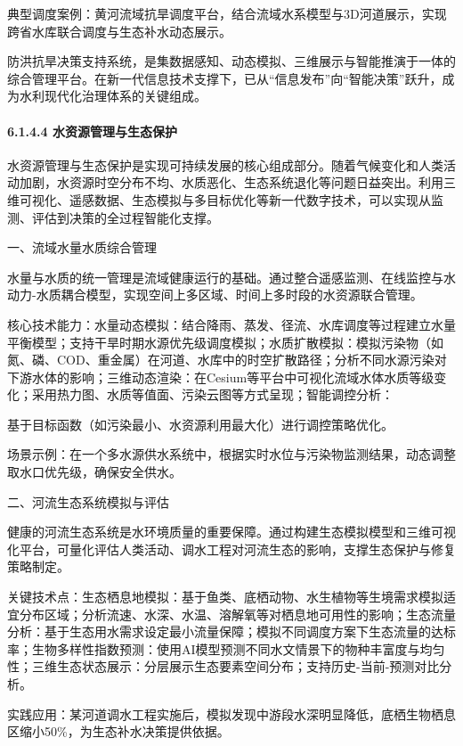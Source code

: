 典型调度案例：黄河流域抗旱调度平台，结合流域水系模型与3D河道展示，实现跨省水库联合调度与生态补水动态展示。

防洪抗旱决策支持系统，是集数据感知、动态模拟、三维展示与智能推演于一体的综合管理平台。在新一代信息技术支撑下，已从``信息发布''向``智能决策''跃升，成为水利现代化治理体系的关键组成。

\paragraph{6.1.4.4 水资源管理与生态保护}\label{ux6c34ux8d44ux6e90ux7ba1ux7406ux4e0eux751fux6001ux4fddux62a4}

水资源管理与生态保护是实现可持续发展的核心组成部分。随着气候变化和人类活动加剧，水资源时空分布不均、水质恶化、生态系统退化等问题日益突出。利用三维可视化、遥感数据、生态模拟与多目标优化等新一代数字技术，可以实现从监测、评估到决策的全过程智能化支撑。

一、流域水量水质综合管理

水量与水质的统一管理是流域健康运行的基础。通过整合遥感监测、在线监控与水动力-水质耦合模型，实现空间上多区域、时间上多时段的水资源联合管理。

核心技术能力：水量动态模拟：结合降雨、蒸发、径流、水库调度等过程建立水量平衡模型；支持干旱时期水源优先级调度模拟；水质扩散模拟：模拟污染物（如氮、磷、COD、重金属）在河道、水库中的时空扩散路径；分析不同水源污染对下游水体的影响；三维动态渲染：在Cesium等平台中可视化流域水体水质等级变化；采用热力图、水质等值面、污染云图等方式呈现；智能调控分析：

基于目标函数（如污染最小、水资源利用最大化）进行调控策略优化。

场景示例：在一个多水源供水系统中，根据实时水位与污染物监测结果，动态调整取水口优先级，确保安全供水。

二、河流生态系统模拟与评估

健康的河流生态系统是水环境质量的重要保障。通过构建生态模拟模型和三维可视化平台，可量化评估人类活动、调水工程对河流生态的影响，支撑生态保护与修复策略制定。

关键技术点：生态栖息地模拟：基于鱼类、底栖动物、水生植物等生境需求模拟适宜分布区域；分析流速、水深、水温、溶解氧等对栖息地可用性的影响；生态流量分析：基于生态用水需求设定最小流量保障；模拟不同调度方案下生态流量的达标率；生物多样性指数预测：使用AI模型预测不同水文情景下的物种丰富度与均匀性；三维生态状态展示：分层展示生态要素空间分布；支持历史-当前-预测对比分析。

实践应用：某河道调水工程实施后，模拟发现中游段水深明显降低，底栖生物栖息区缩小50\%，为生态补水决策提供依据。

